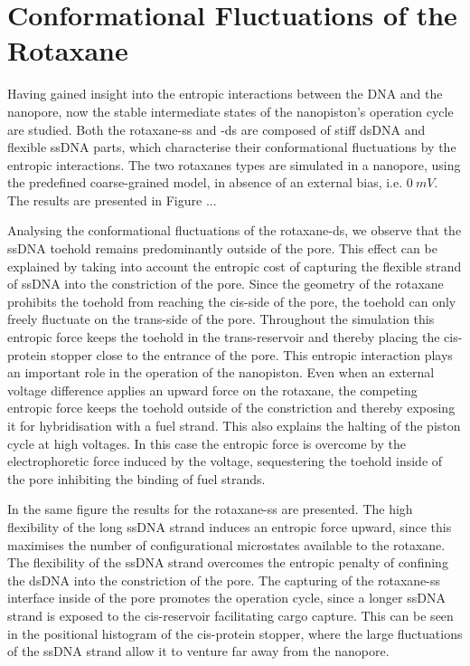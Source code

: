 \newpage
\section{Conformational Fluctuations of the Rotaxane}

Having gained insight into the entropic interactions between the DNA and the
nanopore, now the stable intermediate states of the nanopiston's operation cycle are
studied. Both the rotaxane-ss and -ds are composed of stiff dsDNA and flexible ssDNA
parts, which characterise their conformational fluctuations by the entropic interactions.
The two rotaxanes types are simulated in a nanopore, using the predefined coarse-grained
model, in absence of an external bias, i.e.  $0\ mV$. The results are presented in Figure
...

Analysing the conformational fluctuations of the rotaxane-ds, we observe that the ssDNA
toehold remains predominantly outside of the pore. This effect can be explained by taking
into account the entropic cost of capturing the flexible strand of ssDNA into the
constriction of the pore. Since the geometry of the rotaxane prohibits the toehold from
reaching the cis-side of the pore, the toehold can only freely fluctuate on the
trans-side of the pore. Throughout the simulation this entropic force keeps the toehold
in the trans-reservoir and thereby placing the cis-protein stopper close to the entrance
of the pore. This entropic interaction plays an important role in the operation of the
nanopiston. Even when an external voltage difference applies an upward force on the
rotaxane, the competing entropic force keeps the toehold outside of the constriction and
thereby exposing it for hybridisation with a fuel strand. This also explains the halting
of the piston cycle at high voltages. In this case the entropic force is overcome by the
electrophoretic force induced by the voltage, sequestering the toehold inside of the pore
inhibiting the binding of fuel strands.

In the same figure the results for the rotaxane-ss are presented. The high flexibility
of the long ssDNA strand induces an entropic force upward, since this maximises the
number of configurational microstates available to the rotaxane. The flexibility of the
ssDNA strand overcomes the entropic penalty of confining the dsDNA into the constriction
of the pore. The capturing of the rotaxane-ss interface inside of the pore promotes the
operation cycle, since a longer ssDNA strand is exposed to the cis-reservoir facilitating
cargo capture. This can be seen in the positional histogram of the cis-protein stopper,
where the large fluctuations of the ssDNA strand allow it to venture far away from the
nanopore.

